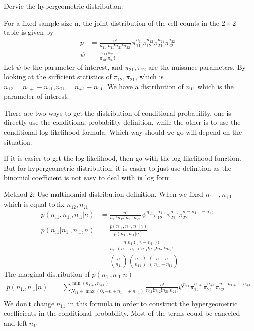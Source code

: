 	Dervie the hypergeometric distribution:
	
	For a fixed sample size n, the joint distribution of the cell counts in the $2 \times 2$ table is given by
\begin{align*}
	p &=  \frac{n!}{n_{11}! n_{12}! n_{21}! n_{22}!} \pi_{11}^{n_{11}} \pi_{12}^{n_{12}} \pi_{21}^{n_{21}} \pi_{22}^{n_{22}}\\
	\psi &= \frac{\pi_{11} \pi_{22}}{\pi_{12}!\pi_{21}!} 
\end{align*}	
Let $\psi$ be the parameter of interest, and $\pi_{21}, \pi_{12}$ are the nuisance parameters. By looking at the sufficient statistics of $\pi_{12}, \pi_{21}$, which is $n_{12} = n_{1+} - n_{11} , n_{21} = n_{+1} - n_{11}$. We have a distribution of $n_{11}$ which is the parameter of interest. 

There are two ways to get the distribution of conditional probability, one is directly use the conditional probability definition, while the other is to use the conditional log-likelihood formula. Which way should we go will depend on the situation. 

If it is easier to get the log-likelihood, then go with the log-likelihood function. But for hypergeometric distribution, it is easier to just use definition as the binomial coefficient is not easy to deal with in log form.

Method 2: Use multinomial distribution definition. When we fixed $n_{1+}, n_{+1}$ which is equal to fix $n_{12}, n_{21}$
\begin{align*}
	p(n_{11}, n_{1.}, n_{.1}| n) &= \frac{n!}{n_{11}!n_{12}!n_{21}!n_{22}!} \psi^{n_{11}} \pi_{12}^{n_{1+}} \pi_{21}^{n_{+1}} \pi_{22}^{n-n_{1+}-n_{+1}}
	 \\
   p(n_{11}| n_{1.}, n_{.1}, n)	&=   \frac{p(n_{11}, n_{1.}, n_{.1}| n)}{p( n_{1.}, n_{.1}| n)}\\
   &= \frac{n! n_{1.}! (n-n_{1.})!}{n_{1.}! (n-n_{1.})! n_{11}!n_{12}!n_{21}!n_{22}!} \\
	&= {n \choose n_{1.}} {n_{1.} \choose n_{11}} {n-n_{1.} \choose n_{.1}-n_{11}} 
\end{align*}
The marginal distribution of $p( n_{1.}, n_{.1}| n)$
\begin{align*}
	p( n_{1.}, n_{.1}| n) &= \sum_{N_{11} \in \max{(0, -n + n_{1+} + n_{+1})}}^{\min{(n_{1+}, n_{+1})}} \frac{n!}{n_{11}!n_{12}!n_{21}!n_{22}!} \psi^{n_{11}} \pi_{12}^{n_{1+}} \pi_{21}^{n_{+1}} \pi_{22}^{n-n_{1+}-n_{+1}}
	\\
\end{align*}
We don't change $n_{11}$ in this formula in order to construct the hypergeometric coefficients in the conditional probability. Most of the terms could be canceled and left $n_{11}$ 


